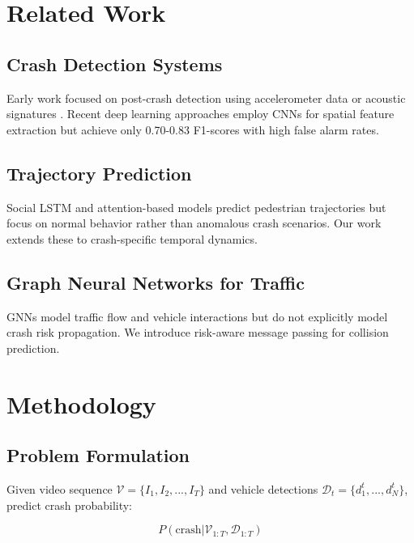 \documentclass[conference]{IEEEtran}
\begin{document}
\section{Related Work}

\subsection{Crash Detection Systems}

Early work focused on post-crash detection using accelerometer data \cite{white2011} or acoustic signatures \cite{dogru2020}. Recent deep learning approaches employ CNNs for spatial feature extraction \cite{yurtsever2020} but achieve only 0.70-0.83 F1-scores with high false alarm rates.

\subsection{Trajectory Prediction}

Social LSTM \cite{alahi2016} and attention-based models \cite{salzmann2020} predict pedestrian trajectories but focus on normal behavior rather than anomalous crash scenarios. Our work extends these to crash-specific temporal dynamics.

\subsection{Graph Neural Networks for Traffic}

GNNs model traffic flow \cite{yu2018} and vehicle interactions \cite{li2019} but do not explicitly model crash risk propagation. We introduce risk-aware message passing for collision prediction.

\section{Methodology}

\subsection{Problem Formulation}

Given video sequence $\mathcal{V} = \{I_1, I_2, ..., I_T\}$ and vehicle detections $\mathcal{D}_t = \{d_1^t, ..., d_N^t\}$, predict crash probability:

\begin{equation}
P(\text{crash} | \mathcal{V}_{1:T}, \mathcal{D}_{1:T})
\end{equation}
\end{document}
